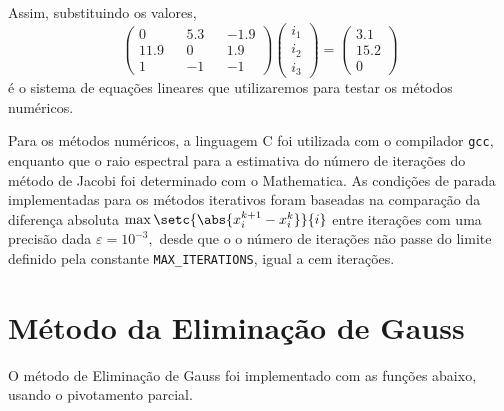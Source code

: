 \documentclass[portuguese,minted]{artigo}
\begin{document}
Assim, substituindo os valores,
\begin{equation*}
    \begin{pmatrix}
        0 && 5.3 && - 1.9\\
        11.9 && 0 && 1.9\\
        1 && -1 && -1
    \end{pmatrix}
    \begin{pmatrix}
        i_1 \\ i_2 \\ i_3
    \end{pmatrix}
    =
    \begin{pmatrix}
        3.1\\
        15.2\\
        0
    \end{pmatrix}
\end{equation*}
é o sistema de equações lineares que utilizaremos para testar os métodos numéricos.

Para os métodos numéricos, a linguagem C foi utilizada com o compilador \verb|gcc|, enquanto que o raio espectral para a estimativa do número de iterações do método de Jacobi foi determinado com o Mathematica. As condições de parada implementadas para os métodos iterativos foram baseadas na comparação da diferença absoluta \(\max\setc{\abs{x^{k+1}_i - x^k_i}}{i}\) entre iterações com uma precisão dada \(\varepsilon = 10^{-3},\) desde que o o número de iterações não passe do limite definido pela constante \verb|MAX_ITERATIONS|, igual a cem iterações.

\section{Método da Eliminação de Gauss}
O método de Eliminação de Gauss foi implementado com as funções abaixo, usando o pivotamento parcial.
\inputminted[firstline=9,lastline=63]{c}{src/main.c}
\end{document}
